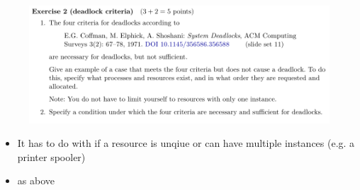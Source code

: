\documentclass[10pt]{beamer}
\begin{document}
\begin{frame}{}
  \begin{figure}
          \includegraphics[keepaspectratio, width=\textwidth, height=\textheight-2\baselineskip-2\baselineskip]{img/ex8_101.png} \\
        \end{figure}
        \begin{itemize}
         \item It has to do with if a resource is unqiue or can have multiple instances (e.g. a printer spooler)
         \item as above
         \end{itemize}
        \framebreak
        

\end{frame}
\end{document}
